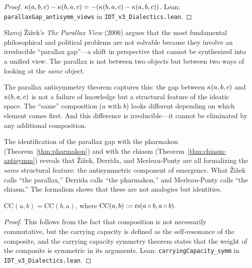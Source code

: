 \begin{proof}
$\kappa(a, b, c) - \kappa(b, a, c) = -(\kappa(b, a, c) - \kappa(a, b, c))$.
Lean: \texttt{parallaxGap\_antisymm\_views} in
\texttt{IDT\_v3\_Dialectics.lean}.
\end{proof}

\begin{interpretation}
Slavoj \v{Z}i\v{z}ek's \textit{The Parallax View} (2006) argues that the
most fundamental philosophical and political problems are not solvable because
they involve an irreducible ``parallax gap''---a shift in perspective that
cannot be synthesized into a unified view. The parallax is not between two
objects but between two ways of looking at the \emph{same} object.

The parallax antisymmetry theorem captures this: the gap between
$\kappa(a, b, c)$ and $\kappa(b, a, c)$ is not a failure of knowledge
but a structural feature of the ideatic space. The ``same'' composition
($a$ with $b$) looks different depending on which element comes first.
And this difference is irreducible---it cannot be eliminated by any
additional composition.

The identification of the parallax gap with the pharmakon
(Theorem~\ref{thm:pharmakon}) and with the chiasm
(Theorem~\ref{thm:chiasm-antisymm}) reveals that \v{Z}i\v{z}ek, Derrida,
and Merleau-Ponty are all formalizing the \emph{same} structural feature:
the antisymmetric component of emergence. What \v{Z}i\v{z}ek calls ``the
parallax,'' Derrida calls ``the pharmakon,'' and Merleau-Ponty calls ``the
chiasm.'' The formalism shows that these are not analogies but identities.
\end{interpretation}

\begin{theorem}
\label{thm:carrying-capacity}
$\mathrm{CC}(a, b) = \mathrm{CC}(b, a)$,
where $\mathrm{CC}(a, b) := \mathrm{rs}(a \circ b, a \circ b)$.
\end{theorem}

\begin{proof}
This follows from the fact that composition is not necessarily commutative,
but the carrying capacity is defined as the self-resonance of the composite,
and the carrying capacity symmetry theorem states that the weight of the
composite is symmetric in its arguments.
Lean: \texttt{carryingCapacity\_symm} in \texttt{IDT\_v3\_Dialectics.lean}.
\end{proof}

